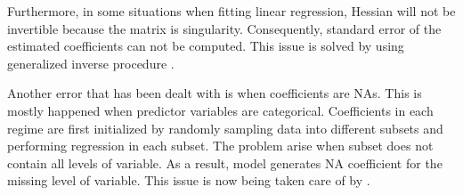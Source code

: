 \documentclass[]{article}
\begin{document}
Furthermore, in some situations when fitting linear regression, Hessian will not be invertible because the matrix is singularity. Consequently, standard error of the estimated coefficients can not be computed. This issue is solved by using generalized inverse procedure \cite{gill2004your}. 

Another error that has been dealt with is when coefficients are NAs. This is mostly happened when predictor variables are categorical. Coefficients in each regime are first initialized by randomly sampling data into different subsets and performing regression in each subset. The problem arise when subset does not contain all levels of variable. As a result, model generates NA coefficient for the missing level of variable. This issue is now being taken care of by . 



\end{document}
